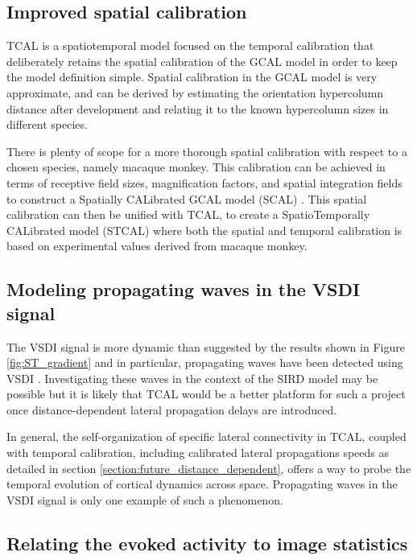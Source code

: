 \documentclass[phd,ianc,twoside]{infthesis}
\begin{document}
\subsection{Improved spatial calibration}
\label{section:future_TCAL_spatial_calibration}

TCAL is a spatiotemporal model focused on the temporal calibration that
deliberately retains the spatial calibration of the GCAL model in order
to keep the model definition simple. Spatial calibration in the GCAL
model is very approximate, and can be derived by estimating the
orientation hypercolumn distance after development and relating it to
the known hypercolumn sizes in different species.

There is plenty of scope for a more thorough spatial calibration with
respect to a chosen species, namely macaque monkey. This calibration can
be achieved in terms of receptive field sizes, magnification factors,
and spatial integration fields to construct a Spatially CALibrated GCAL
model (SCAL) \citep{rudiger_thesis16}. This spatial calibration can then
be unified with TCAL, to create a SpatioTemporally CALibrated model
(STCAL) where both the spatial and temporal calibration is based on
experimental values derived from macaque monkey.

\subsection{Modeling propagating waves in the VSDI signal}
\label{section:future_TCAL_waves}

The VSDI signal is more dynamic than suggested by the results shown in
Figure \ref{fig:ST_gradient} and in particular, propagating waves have
been detected using VSDI
\citep{muller_nature13,sato_neuron12}. Investigating these waves in the context of
the SIRD model may be possible but it is likely that TCAL
would be a better platform for such a project once distance-dependent lateral propagation delays
are introduced.

In general, the self-organization of specific lateral connectivity in
TCAL, coupled with temporal calibration, including calibrated lateral
propagations speeds as detailed in section
\ref{section:future_distance_dependent}, offers a way to probe the
temporal evolution of cortical dynamics across space. Propagating waves
in the VSDI signal is only one example of such a phenomenon.


\subsection{Relating the evoked activity to image statistics}
\label{section:future_image_statistics}
\end{document}
